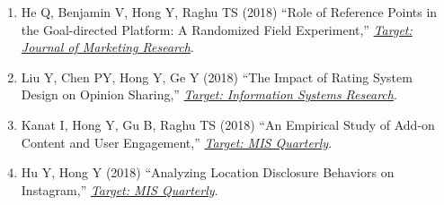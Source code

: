 \documentclass[paper=letter,fontsize=10pt]{scrartcl} %
\newcommand{\WPEntry}[5]{
        \noindent #1 (#2) ``#3,'' \textit{\ul{#4}}. #5}
\newcommand{\Hong}{Hong Y}
\begin{document}
\begin{enumerate}
\item \WPEntry{He Q, Benjamin V, \Hong, Raghu TS}{2018}{Role of Reference Points in the Goal-directed Platform: A Randomized Field Experiment}{\protect\newline Target: Journal of Marketing Research}{}{}

\item \WPEntry{Liu Y, Chen PY, \Hong, Ge Y}{2018}{The Impact of Rating System Design on Opinion Sharing}{\protect\newline Target: Information Systems Research}{}{}

\item \WPEntry{Kanat I, \Hong, Gu B, Raghu TS}{2018}{An Empirical Study of Add-on Content and User Engagement}{\protect\newline Target: MIS Quarterly}{}{}

\item \WPEntry{Hu Y, \Hong}{2018}{Analyzing Location Disclosure Behaviors on Instagram}{\protect\newline Target: MIS Quarterly}{}{}

\end{enumerate}


\end{document}
